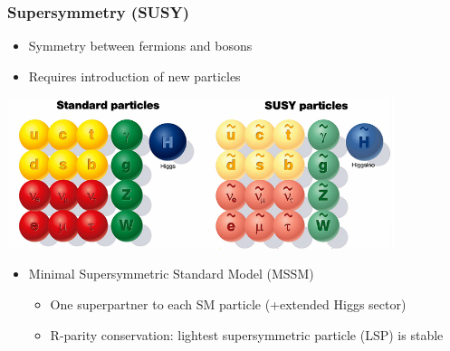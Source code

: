 \documentclass{beamer}
\begin{document}
\begin{frame}[t]
  \frametitle{Supersymmetry (SUSY)}
  \begin{block}{}
    \begin{itemize}
    \item Symmetry between fermions and bosons
    \item Requires introduction of new particles
    \end{itemize}
  \end{block}
  \begin{center}
    \includegraphics[width=0.85\textwidth]{susy/Particles_MSSM.png}
  \end{center}
  \vskip-0.3cm
  \begin{itemize}
  \item Minimal Supersymmetric Standard Model (MSSM)
    \begin{itemize}
    \item One superpartner to each SM particle (+extended Higgs sector)
    \item R-parity conservation: lightest supersymmetric particle (LSP) is stable
    \end{itemize}
  \end{itemize}
\end{frame}
\end{document}
